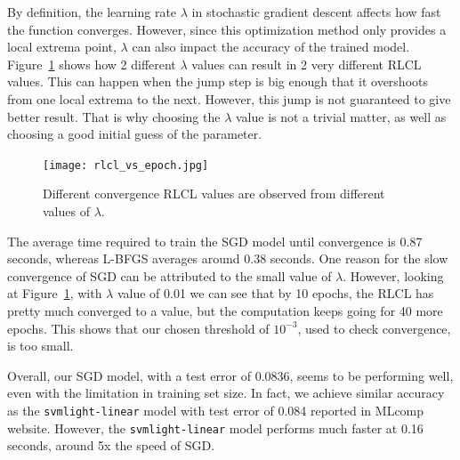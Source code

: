 \documentclass{article} %
\begin{document}
By definition, the learning rate $\lambda$ in stochastic gradient descent affects how fast the function converges.
 However, since this optimization method only provides a local extrema point, $\lambda$ can also impact the accuracy of the trained model.
 Figure~\ref{fig:rlcl_epoch} shows how 2 different $\lambda$ values can result in 2 very different RLCL values.
 This can happen when the jump step is big enough that it overshoots from one local extrema to the next.
 However, this jump is not guaranteed to give better result. That is why choosing the $\lambda$ value is not a trivial matter, as well as choosing a good initial guess of the parameter.


\begin{figure}[!h]
\begin{center}
    \texttt{[image: rlcl\_vs\_epoch.jpg]}
    \caption{Different convergence RLCL values are observed from different values of $\lambda$.}
    \label{fig:rlcl_epoch}
\end{center}
\end{figure}

The average time required to train the SGD model until convergence is 0.87 seconds, whereas L-BFGS averages around 0.38 seconds.
 One reason for the slow convergence of SGD can be attributed to the small value of $\lambda$.
 However, looking at Figure~\ref{fig:rlcl_epoch}, with $\lambda$ value of 0.01 we can see that by 10 epochs, the RLCL has pretty much converged to a value, but the computation keeps going for 40 more epochs. This shows that our chosen threshold of $10^{-3}$, used to check convergence, is too small.

Overall, our SGD model, with a test error of 0.0836, seems to be performing well, even with the limitation in training set size. In fact, we achieve similar accuracy as the {\tt svmlight-linear} model with test error of 0.084 reported in MLcomp website. However, the {\tt svmlight-linear} model performs much faster at 0.16 seconds, around 5x the speed of SGD.
\end{document}
